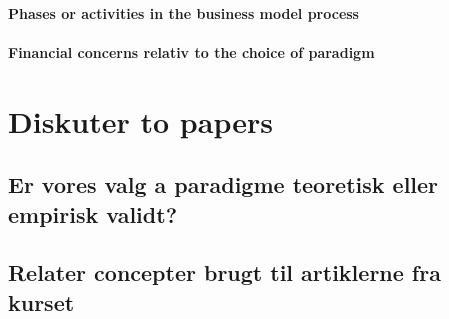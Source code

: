 \documentclass[a4paper]{article}
\begin{document}
\paragraph{Phases or activities in the business model process}
\paragraph{Financial concerns relativ to the choice of paradigm}

\section{Diskuter to papers}
\subsection{Er vores valg a paradigme teoretisk eller empirisk validt?}
\subsection{Relater concepter brugt til artiklerne fra kurset}

\printbibliography[heading=bibintoc]
\end{document}

